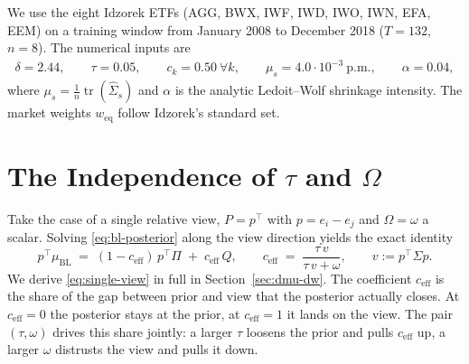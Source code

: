 \documentclass[a4paper,11pt]{article}
\theoremstyle{plain}
\theoremstyle{definition}
\newcommand{\muBL}{\mu_{\mathrm{BL}}}
\newcommand{\eff}{\mathrm{eff}}
\begin{document}
We use the eight Idzorek ETFs (AGG, BWX, IWF, IWD, IWO, IWN, EFA, EEM) on a
training window from January 2008 to December 2018 ($T = 132$, $n = 8$). The
numerical inputs are
\begin{align*}
  \delta = 2.44, \qquad \tau = 0.05, \qquad c_k = 0.50 \ \forall k,
  \qquad \mu_s = 4.0 \cdot 10^{-3}\ \text{p.m.}, \qquad \alpha = 0.04,
\end{align*}
where $\mu_s = \tfrac{1}{n}\operatorname{tr}(\hat\Sigma_s)$ and $\alpha$ is the
analytic Ledoit--Wolf shrinkage intensity. The market weights $w_{\mathrm{eq}}$
follow Idzorek's standard set.

\section{The Independence of $\tau$ and $\Omega$}
\label{sec:tau-omega}

Take the case of a single relative view, $P = p^\top$ with $p = e_i - e_j$ and
$\Omega = \omega$ a scalar. Solving \eqref{eq:bl-posterior} along the view
direction yields the exact identity
\begin{equation}
\label{eq:single-view}
  p^\top\muBL \;=\; (1 - c_{\eff})\,p^\top\Pi \;+\; c_{\eff}\,Q,
  \qquad c_{\eff} \;=\; \frac{\tau\,v}{\tau\,v + \omega},
  \qquad v := p^\top\Sigma p .
\end{equation}
We derive \eqref{eq:single-view} in full in Section~\ref{sec:dmu-dw}. The
coefficient $c_{\eff}$ is the share of the gap between prior and view that the
posterior actually closes. At $c_{\eff} = 0$ the posterior stays at the prior, at
$c_{\eff} = 1$ it lands on the view. The pair $(\tau, \omega)$ drives this share
jointly: a larger $\tau$ loosens the prior and pulls $c_{\eff}$ up, a larger
$\omega$ distrusts the view and pulls it down.
\end{document}
